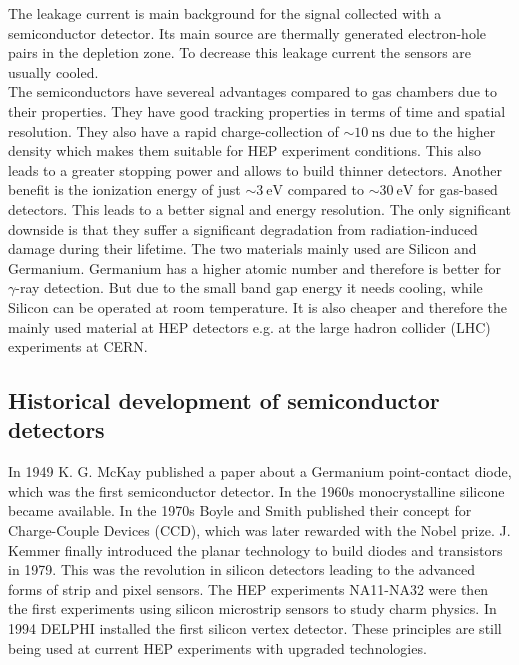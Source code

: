 The leakage current is main background for the signal collected with a semiconductor detector. Its main source are thermally generated electron-hole pairs in the depletion zone. To decrease this leakage current the sensors are usually cooled.\\
The semiconductors have severeal advantages compared to gas chambers due to their properties. They have good tracking properties in terms of time and spatial resolution. They also have a rapid charge-collection of $\sim\SI{10}{\nano\second}$ due to the higher density which makes them suitable for HEP experiment conditions. This also leads to a greater stopping power and allows to build thinner detectors. Another benefit is the ionization energy of just $\sim\SI{3}{\electronvolt}$ compared to $\sim\SI{30}{\electronvolt}$ for gas-based detectors. This leads to a better signal and energy resolution. The only significant downside is that they suffer a significant degradation from radiation-induced damage during their lifetime. The two materials mainly used are Silicon and Germanium. Germanium has a higher atomic number and therefore is better for $\gamma$-ray detection. But due to the small band gap energy it needs cooling, while Silicon can be operated at room temperature. It is also cheaper and therefore the mainly used material at HEP detectors e.g. at the large hadron collider (LHC) experiments at CERN.
\subsection{Historical development of semiconductor detectors}
In 1949 K. G. McKay published a paper about a Germanium point-contact diode, which was the first semiconductor detector. In the 1960s monocrystalline silicone became available. In the 1970s Boyle and Smith published their concept for Charge-Couple Devices (CCD), which was later rewarded with the Nobel prize. J. Kemmer finally introduced the planar technology to build diodes and transistors in 1979. This was the revolution in silicon detectors leading to the advanced forms of strip and pixel sensors. The HEP experiments NA11-NA32 were then the first experiments using silicon microstrip sensors to study charm physics. In 1994 DELPHI installed the first silicon vertex detector. These principles are still being used at current HEP experiments with upgraded technologies.

